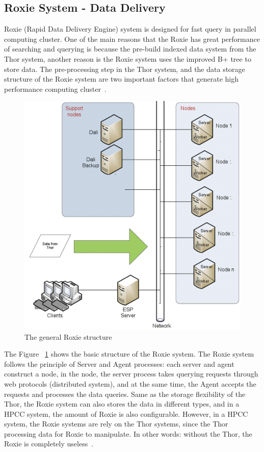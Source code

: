 \subsection{Roxie System - Data Delivery}
Roxie (Rapid Data Delivery Engine) system is designed for fast query in parallel computing cluster. One of the main reasons that the Roxie has great performance of searching and querying is because the pre-build indexed data system from the Thor system, another reason is the Roxie system uses the improved B+ tree to store data. The pre-processing step in the Thor system, and the data storage structure of the Roxie system are two important factors that generate high performance computing cluster~\cite{Intro4}.  

\begin{figure}[!ht]
\centering\includegraphics[width=\columnwidth]{images/roxie.png}
\caption{The general Roxie structure}\label{f:roxie}
\end{figure}

The Figure ~\ref{f:roxie} shows the basic structure of the Roxie system. The Roxie system follows the principle of Server and Agent processes: each server and agent construct a node, in the node, the server process takes querying requests through web protocols (distributed system), and at the same time, the Agent accepts the requests and processes the data queries. Same as the storage flexibility of the Thor, the Roxie system can also stores the data in different types, and in a HPCC system, the amount of Roxie is also configurable. However, in a HPCC system, the Roxie systems are rely on the Thor systems, since the Thor processing data for Roxie to manipulate. In other words: without the Thor, the Roxie is completely useless~\cite{Intro4}.

